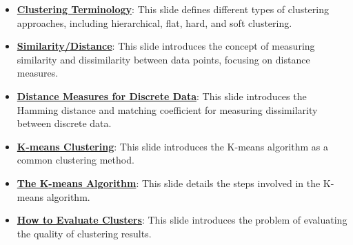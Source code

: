 \documentclass{article}%
\begin{document}
\begin{itemize}[leftmargin=*]
\item \href{https://purdue.brightspace.com/d2l/common/assets/pdfjs-d2l-dist/1.0.14-legacy/web/viewer.html?file=\%2Fcontent\%2Fenforced\%2F1095465-WL.202510.CS24200.LE1\%2F17L2-distance-clusters.pdf\%3Fou\%3D1095465\&lang=en-us\&container=d2l-fileviewer-rendered-pdf\&fullscreen=d2l-fileviewer-rendered-pdf-dialog\&height=667#page=15}{\textbf{Clustering Terminology}}: This slide defines different types of clustering approaches, including hierarchical, flat, hard, and soft clustering.%
\item \href{https://purdue.brightspace.com/d2l/common/assets/pdfjs-d2l-dist/1.0.14-legacy/web/viewer.html?file=\%2Fcontent\%2Fenforced\%2F1095465-WL.202510.CS24200.LE1\%2F17L2-distance-clusters.pdf\%3Fou\%3D1095465\&lang=en-us\&container=d2l-fileviewer-rendered-pdf\&fullscreen=d2l-fileviewer-rendered-pdf-dialog\&height=667#page=16}{\textbf{Similarity/Distance}}: This slide introduces the concept of measuring similarity and dissimilarity between data points, focusing on distance measures.%
\item \href{https://purdue.brightspace.com/d2l/common/assets/pdfjs-d2l-dist/1.0.14-legacy/web/viewer.html?file=\%2Fcontent\%2Fenforced\%2F1095465-WL.202510.CS24200.LE1\%2F17L2-distance-clusters.pdf\%3Fou\%3D1095465\&lang=en-us\&container=d2l-fileviewer-rendered-pdf\&fullscreen=d2l-fileviewer-rendered-pdf-dialog\&height=667#page=19}{\textbf{Distance Measures for Discrete Data}}: This slide introduces the Hamming distance and matching coefficient for measuring dissimilarity between discrete data.%
\item \href{https://purdue.brightspace.com/d2l/common/assets/pdfjs-d2l-dist/1.0.14-legacy/web/viewer.html?file=\%2Fcontent\%2Fenforced\%2F1095465-WL.202510.CS24200.LE1\%2F17L2-distance-clusters.pdf\%3Fou\%3D1095465\&lang=en-us\&container=d2l-fileviewer-rendered-pdf\&fullscreen=d2l-fileviewer-rendered-pdf-dialog\&height=667#page=21}{\textbf{K{-}means Clustering}}: This slide introduces the K-means algorithm as a common clustering method.%
\item \href{https://purdue.brightspace.com/d2l/common/assets/pdfjs-d2l-dist/1.0.14-legacy/web/viewer.html?file=\%2Fcontent\%2Fenforced\%2F1095465-WL.202510.CS24200.LE1\%2F17L2-distance-clusters.pdf\%3Fou\%3D1095465\&lang=en-us\&container=d2l-fileviewer-rendered-pdf\&fullscreen=d2l-fileviewer-rendered-pdf-dialog\&height=667#page=22}{\textbf{The K{-}means Algorithm}}: This slide details the steps involved in the K-means algorithm.%
\item \href{https://purdue.brightspace.com/d2l/common/assets/pdfjs-d2l-dist/1.0.14-legacy/web/viewer.html?file=\%2Fcontent\%2Fenforced\%2F1095465-WL.202510.CS24200.LE1\%2F17L2-distance-clusters.pdf\%3Fou\%3D1095465\&lang=en-us\&container=d2l-fileviewer-rendered-pdf\&fullscreen=d2l-fileviewer-rendered-pdf-dialog\&height=667#page=32}{\textbf{How to Evaluate Clusters}}: This slide introduces the problem of evaluating the quality of clustering results.%

\end{itemize}
\end{document}
